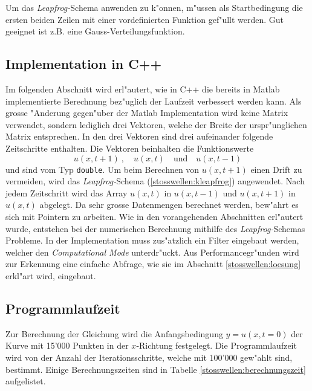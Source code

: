 \begin{refsection}
Um das \textit{Leapfrog-}Schema anwenden zu k"onnen, m"ussen als
Startbedingung die ersten beiden Zeilen mit einer vordefinierten Funktion
gef"ullt werden. Gut geeignet ist z.B. eine Gauss-Verteilungsfunktion. 

\subsection{Implementation in C++}
Im folgenden Abschnitt wird erl"autert, wie in C++ die bereits in Matlab
implementierte Berechnung bez"uglich der Laufzeit verbessert werden kann.
Als grosse "Anderung gegen"uber der Matlab Implementation wird keine Matrix verwendet, sondern lediglich drei Vektoren, welche der Breite der urspr"unglichen Matrix entsprechen. In den drei Vektoren sind drei aufeinander folgende Zeitschritte enthalten. Die Vektoren beinhalten die Funktionswerte
\[
u(x,t\! + \! 1) \ , \quad u(x, t) \quad \text{und} \quad u(x, t\! - \! 1)
\]
und sind vom Typ \texttt{double}.
Um beim Berechnen von $u(x, t \! + \! 1)$ einen Drift zu vermeiden,
wird das \textit{Leapfrog-}Schema (\ref{stosswellen:kleapfrog})
angewendet. Nach jedem Zeitschritt wird das Array $u(x, t)$ in $u(x,
t \! - \! 1)$ und $u(x, t \! + \! 1)$ in $u(x, t)$ abgelegt. Da sehr
grosse Datenmengen berechnet werden, bew"ahrt es sich mit Pointern zu
arbeiten. Wie in den vorangehenden Abschnitten erl"autert wurde, entstehen
bei der numerischen Berechnung mithilfe des \textit{Leapfrog-}Schemas
Probleme. In der Implementation muss zus"atzlich ein Filter eingebaut
werden, welcher den \textit{Computational Mode} unterdr"uckt. Aus
Performancegr"unden wird zur Erkennung eine einfache Abfrage, wie sie
im Abschnitt \ref{stosswellen:loesung} erkl"art wird, eingebaut. 


\subsection{Programmlaufzeit}

Zur Berechnung der Gleichung wird die Anfangsbedingung $y=u(x, t=0)$
der Kurve mit 15'000 Punkten in der $x$-Richtung festgelegt. Die
Programmlaufzeit wird von der Anzahl der Iterationsschritte, welche mit
100'000 gew"ahlt sind, bestimmt. 
Einige Berechnungszeiten sind in Tabelle \ref{stosswellen:berechnungszeit}
aufgelistet.


\end{refsection}
